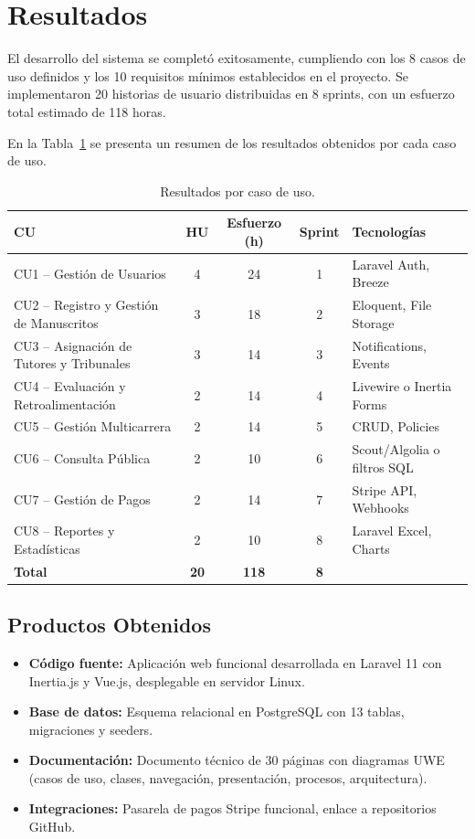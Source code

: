 \section{Resultados}
\label{sec:resultados}

El desarrollo del sistema se completó exitosamente, cumpliendo con los 8 casos de uso definidos y los 10 requisitos mínimos establecidos en el proyecto. Se implementaron 20 historias de usuario distribuidas en 8 sprints, con un esfuerzo total estimado de 118 horas.

En la Tabla~\ref{tab:resultados} se presenta un resumen de los resultados obtenidos por cada caso de uso.

\begin{table}[H]
\centering
\caption{Resultados por caso de uso.}
\label{tab:resultados}
\begin{tabular}{lcccl}
\toprule
\textbf{CU} & \textbf{HU} & \textbf{Esfuerzo (h)} & \textbf{Sprint} & \textbf{Tecnologías} \\
\midrule
CU1 -- Gestión de Usuarios & 4 & 24 & 1 & Laravel Auth, Breeze \\
CU2 -- Registro y Gestión de Manuscritos & 3 & 18 & 2 & Eloquent, File Storage \\
CU3 -- Asignación de Tutores y Tribunales & 3 & 14 & 3 & Notifications, Events \\
CU4 -- Evaluación y Retroalimentación & 2 & 14 & 4 & Livewire o Inertia Forms \\
CU5 -- Gestión Multicarrera & 2 & 14 & 5 & CRUD, Policies \\
CU6 -- Consulta Pública & 2 & 10 & 6 & Scout/Algolia o filtros SQL \\
CU7 -- Gestión de Pagos & 2 & 14 & 7 & Stripe API, Webhooks \\
CU8 -- Reportes y Estadísticas & 2 & 10 & 8 & Laravel Excel, Charts \\
\midrule
\textbf{Total} & \textbf{20} & \textbf{118} & \textbf{8} & \\
\bottomrule
\end{tabular}
\end{table}

\subsection{Productos Obtenidos}

\begin{itemize}
    \item \textbf{Código fuente:} Aplicación web funcional desarrollada en Laravel 11 con Inertia.js y Vue.js, desplegable en servidor Linux.
    \item \textbf{Base de datos:} Esquema relacional en PostgreSQL con 13 tablas, migraciones y seeders.
    \item \textbf{Documentación:} Documento técnico de 30 páginas con diagramas UWE (casos de uso, clases, navegación, presentación, procesos, arquitectura).
    \item \textbf{Integraciones:} Pasarela de pagos Stripe funcional, enlace a repositorios GitHub.
\end{itemize}

